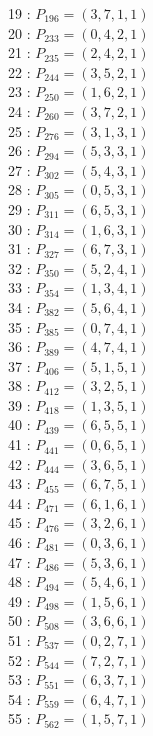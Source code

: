 \documentclass{article}
\begin{document}
{\begin{multicols}{2}
19 : $P_{196}=( 3, 7, 1, 1 )$\\
20 : $P_{233}=( 0, 4, 2, 1 )$\\
21 : $P_{235}=( 2, 4, 2, 1 )$\\
22 : $P_{244}=( 3, 5, 2, 1 )$\\
23 : $P_{250}=( 1, 6, 2, 1 )$\\
24 : $P_{260}=( 3, 7, 2, 1 )$\\
25 : $P_{276}=( 3, 1, 3, 1 )$\\
26 : $P_{294}=( 5, 3, 3, 1 )$\\
27 : $P_{302}=( 5, 4, 3, 1 )$\\
28 : $P_{305}=( 0, 5, 3, 1 )$\\
29 : $P_{311}=( 6, 5, 3, 1 )$\\
30 : $P_{314}=( 1, 6, 3, 1 )$\\
31 : $P_{327}=( 6, 7, 3, 1 )$\\
32 : $P_{350}=( 5, 2, 4, 1 )$\\
33 : $P_{354}=( 1, 3, 4, 1 )$\\
34 : $P_{382}=( 5, 6, 4, 1 )$\\
35 : $P_{385}=( 0, 7, 4, 1 )$\\
36 : $P_{389}=( 4, 7, 4, 1 )$\\
37 : $P_{406}=( 5, 1, 5, 1 )$\\
38 : $P_{412}=( 3, 2, 5, 1 )$\\
39 : $P_{418}=( 1, 3, 5, 1 )$\\
40 : $P_{439}=( 6, 5, 5, 1 )$\\
41 : $P_{441}=( 0, 6, 5, 1 )$\\
42 : $P_{444}=( 3, 6, 5, 1 )$\\
43 : $P_{455}=( 6, 7, 5, 1 )$\\
44 : $P_{471}=( 6, 1, 6, 1 )$\\
45 : $P_{476}=( 3, 2, 6, 1 )$\\
46 : $P_{481}=( 0, 3, 6, 1 )$\\
47 : $P_{486}=( 5, 3, 6, 1 )$\\
48 : $P_{494}=( 5, 4, 6, 1 )$\\
49 : $P_{498}=( 1, 5, 6, 1 )$\\
50 : $P_{508}=( 3, 6, 6, 1 )$\\
51 : $P_{537}=( 0, 2, 7, 1 )$\\
52 : $P_{544}=( 7, 2, 7, 1 )$\\
53 : $P_{551}=( 6, 3, 7, 1 )$\\
54 : $P_{559}=( 6, 4, 7, 1 )$\\
55 : $P_{562}=( 1, 5, 7, 1 )$\\
\end{multicols}
}
\end{document}
